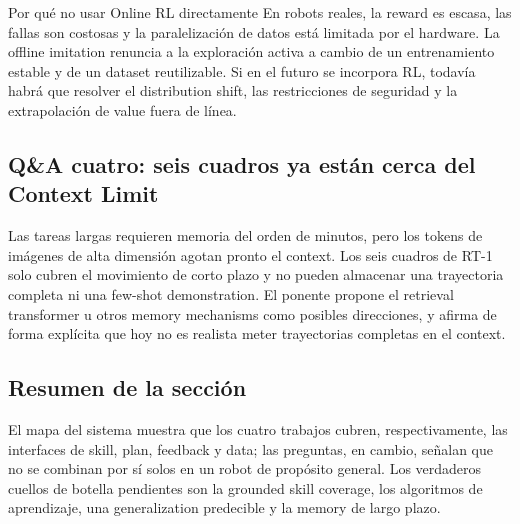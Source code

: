 \begin{knowledgebox}{Por qué no usar Online RL directamente}
En robots reales, la reward es escasa, las fallas son costosas y la paralelización de datos está limitada por el hardware. La offline imitation renuncia a la exploración activa a cambio de un entrenamiento estable y de un dataset reutilizable. Si en el futuro se incorpora RL, todavía habrá que resolver el distribution shift, las restricciones de seguridad y la extrapolación de value fuera de línea.
\end{knowledgebox}

\subsection{Q\&A cuatro: seis cuadros ya están cerca del Context Limit}

Las tareas largas requieren memoria del orden de minutos, pero los tokens de imágenes de alta dimensión agotan pronto el context. Los seis cuadros de RT-1 solo cubren el movimiento de corto plazo y no pueden almacenar una trayectoria completa ni una few-shot demonstration. El ponente propone el retrieval transformer u otros memory mechanisms como posibles direcciones, y afirma de forma explícita que hoy no es realista meter trayectorias completas en el context.


\subsection{Resumen de la sección}

El mapa del sistema muestra que los cuatro trabajos cubren, respectivamente, las interfaces de skill, plan, feedback y data; las preguntas, en cambio, señalan que no se combinan por sí solos en un robot de propósito general. Los verdaderos cuellos de botella pendientes son la grounded skill coverage, los algoritmos de aprendizaje, una generalization predecible y la memory de largo plazo.
